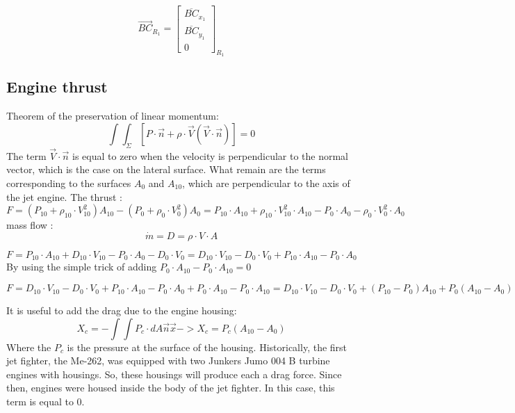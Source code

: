 \documentclass[12pt,a4paper]{article}
\begin{document}
	
	\begin{equation}
		\vec{BC}_{R_{1}}=
		\begin{bmatrix}
			\overline{BC}_{x_1} \\
			\overline{BC}_{y_1}\\
			0
		\end{bmatrix}_{R_{1}} 
	\end{equation}
	
	\subsection{Engine thrust}
	Theorem of the preservation of linear momentum:
	\begin{equation}
		\int \int_{\Sigma} [P \cdot \vec{n}+ \rho \cdot \vec{V} (\vec{V} \cdot \vec{n})] = 0
	\end{equation}
	The term $\vec{V} \cdot \vec{n}$ is equal to zero when the velocity is perpendicular to the normal vector, which is the case on the lateral surface.
	What remain are the terms corresponding to the surfaces $A_0$ and $A_{10}$, which are perpendicular to the axis of the jet engine. 
	The thrust : 
	\begin{dmath}
		F = (P_{10} + \rho_{10} \cdot V_{10}^2) A_{10} - (P_{0} + \rho_{0} \cdot V_{0}^2) A_0 = P_{10} \cdot A_{10} + \rho_{10} \cdot V_{10}^2 \cdot A_{10} - P_{0} \cdot A_0 - \rho_{0} \cdot V_{0}^2 \cdot A_0
	\end{dmath}
	mass flow : 
	\begin{equation}
		\dot{m} = D = \rho \cdot V \cdot A
	\end{equation}
	
	\begin{dmath}
		F = P_{10} \cdot A_{10} + D_{10} \cdot V_{10} - P_{0} \cdot A_0 - D_{0} \cdot V_{0} = D_{10} \cdot V_{10} - D_{0} \cdot V_{0} + P_{10} \cdot A_{10} - P_{0} \cdot A_0
	\end{dmath}
	By using the simple trick of adding $P_0 \cdot A_{10} - P_0 \cdot A_{10}=0$
	
	\begin{dmath}
		F = D_{10} \cdot V_{10} - D_{0} \cdot V_{0} + P_{10} \cdot A_{10} - P_{0} \cdot A_0 + P_0 \cdot A_{10} - P_0 \cdot A_{10} = D_{10} \cdot V_{10} - D_{0} \cdot V_{0} + (P_{10} - P_0) A_{10} + P_0 (A_{10} -A_0)
	\end{dmath}
	
	It is useful to add the drag due to the engine housing: 
	\begin{equation}
		X_c = - \int \int P_c \cdot dA \vec{n} \vec{x} -> X_c = P_c (A_{10} - A_0)
	\end{equation}
	Where the $P_c$ is the pressure at the surface of the housing. 
	Historically, the first jet fighter, the Me-262, was equipped with two Junkers Jumo 004 B turbine engines with housings. So, these housings will produce each a drag force. 
	Since then, engines were housed inside the body of the jet fighter. In this case, this term is equal to 0. 
		
\end{document}
